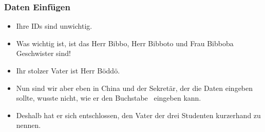 \documentclass[aspectratio=169,mathserif,notheorems]{beamer}%
\begin{document}
%
\begin{frame}[t]%
\frametitle{Daten Einfügen}%
\parbox{0.435\linewidth}{\small%
\begin{itemize}%
%
%
%
%
%
%
%
\item<4-> Ihre IDs sind unwichtig.%
%
\item<5-> Was wichtig ist, ist das Herr Bibbo, Herr Bibboto und Frau Bibboba Geschwister sind!%
%
\item<6-> Ihr stolzer Vater ist Herr B{\"o}dd{\"o}.%
%
\item<7-> Nun sind wir aber eben in China und der Sekretär, der die Daten eingeben sollte, wusste nicht, wie er den Buchstabe~ eingeben kann.%
%
\item<8-> Deshalb hat er sich entschlossen, den Vater der drei Studenten kurzerhand  zu nennen.%
\end{itemize}%
}%
%
%
%
%
\end{frame}%
%
\end{document}

